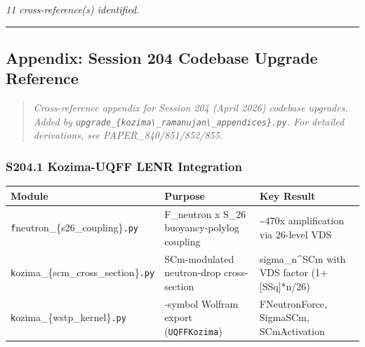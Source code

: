 \emph{11 cross-reference(s) identified.}

\begin{center}\rule{0.5\linewidth}{0.5pt}\end{center}

\subsection{Appendix: Session 204 Codebase Upgrade
Reference}\label{appendix-session-204-codebase-upgrade-reference}

\begin{quote}
\emph{Cross-reference appendix for Session 204 (April 2026) codebase
upgrades. Added by
\texttt{upgrade\_\{kozima\textbackslash{}\_ramanujan\textbackslash{}\_appendices\}.py}.
For detailed derivations, see PAPER\_840/851/852/855.}
\end{quote}

\subsubsection{S204.1 Kozima-UQFF LENR
Integration}\label{s204.1-kozima-uqff-lenr-integration}

{\def\LTcaptype{none} %
\begin{longtable}[]{@{}
  >{\raggedright\arraybackslash}p{}
  >{\raggedright\arraybackslash}p{}
  >{\raggedright\arraybackslash}p{}@{}}
\toprule\noalign{}
\begin{minipage}[b]{\linewidth}\raggedright
Module
\end{minipage} & \begin{minipage}[b]{\linewidth}\raggedright
Purpose
\end{minipage} & \begin{minipage}[b]{\linewidth}\raggedright
Key Result
\end{minipage} \\
\midrule\noalign{}
\endhead
\bottomrule\noalign{}
\endlastfoot
\texttt{f}neutron\_\{s26\_coupling\}\texttt{.py} & F\_neutron x S\_26
buoyancy-polylog coupling & \textasciitilde470x amplification via
26-level VDS \\
\texttt{k}ozima\_\{scm\_cross\_section\}\texttt{.py} & SCm-modulated
neutron-drop cross-section & sigma\_n\^{}SCm with VDS factor
(1+{[}SSq{]}*n/26) \\
\texttt{k}ozima\_\{wstp\_kernel\}\texttt{.py} & 11-symbol Wolfram export
(\texttt{UQFFKozima}) & FNeutronForce, SigmaSCm, SCmActivation \\
\end{longtable}
}

